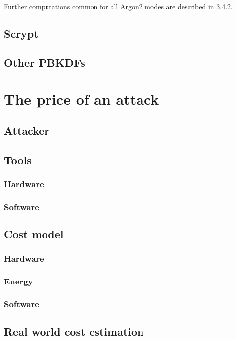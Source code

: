 \documentclass[nolof]{fithesis3}
\begin{document}
Further computations common for all Argon2 modes are described in \parencite{argon2draft}{3.4.2}.

\section{Scrypt}


\section{Other PBKDFs}

\chapter{The price of an attack}

\section{Attacker}

\section{Tools}

\subsection{Hardware}

\subsection{Software}

\section{Cost model}

\subsection{Hardware}

\subsection{Energy}

\subsection{Software}

\section{Real world cost estimation}
\end{document}
